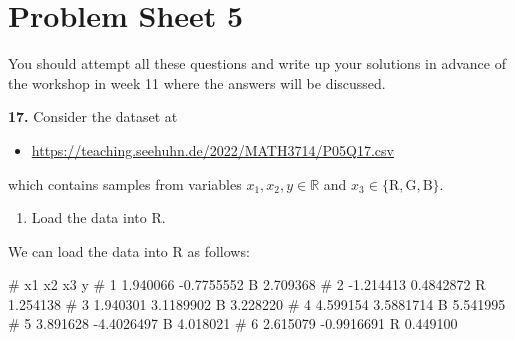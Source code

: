 \documentclass[
  a4paper,
]{article}
\newenvironment{Shaded}{\begin{snugshade}}{\end{snugshade}}
\newcommand{\AttributeTok}[1]{\textcolor[rgb]{0.13,0.29,0.53}{#1}}
\newcommand{\CommentTok}[1]{\textcolor[rgb]{0.56,0.35,0.01}{\textit{#1}}}
\newcommand{\FunctionTok}[1]{\textcolor[rgb]{0.13,0.29,0.53}{\textbf{#1}}}
\newcommand{\NormalTok}[1]{#1}
\newcommand{\OtherTok}[1]{\textcolor[rgb]{0.56,0.35,0.01}{#1}}
\newcommand{\SpecialCharTok}[1]{\textcolor[rgb]{0.81,0.36,0.00}{\textbf{#1}}}
\newcommand{\StringTok}[1]{\textcolor[rgb]{0.31,0.60,0.02}{#1}}
\providecommand{\tightlist}{%
  \setlength{\itemsep}{0pt}\setlength{\parskip}{0pt}}
\theoremstyle{definition}
\theoremstyle{definition}
\theoremstyle{definition}
\theoremstyle{definition}
\theoremstyle{remark}
\begin{document}
\clearpage

\section*{Problem Sheet 5}\label{P05}


You should attempt all these questions and write up your solutions in advance
of the workshop in week 11 where the answers will be discussed.

\textbf{17.} Consider the dataset at

\begin{itemize}
\tightlist
\item
  \url{https://teaching.seehuhn.de/2022/MATH3714/P05Q17.csv}
\end{itemize}

which contains samples from variables \(x_1, x_2, y \in \mathbb{R}\) and
\(x_3 \in \{\mathrm{R}, \mathrm{G}, \mathrm{B}\}\).

\begin{enumerate}
\def\labelenumi{\alph{enumi}.}
\tightlist
\item
  Load the data into R.
\end{enumerate}

\begin{myanswers}

We can load the data into R as follows:

\begin{Shaded}
\end{Shaded}

\begin{Shaded}
\begin{Highlighting}[]
\NormalTok{\#          x1         x2 x3        y}
\NormalTok{\# 1  1.940066 {-}0.7755552  B 2.709368}
\NormalTok{\# 2 {-}1.214413  0.4842872  R 1.254138}
\NormalTok{\# 3  1.940301  3.1189902  B 3.228220}
\NormalTok{\# 4  4.599154  3.5881714  B 5.541995}
\NormalTok{\# 5  3.891628 {-}4.4026497  B 4.018021}
\NormalTok{\# 6  2.615079 {-}0.9916691  R 0.449100}
\end{Highlighting}
\end{Shaded}

\end{myanswers}
\end{document}
